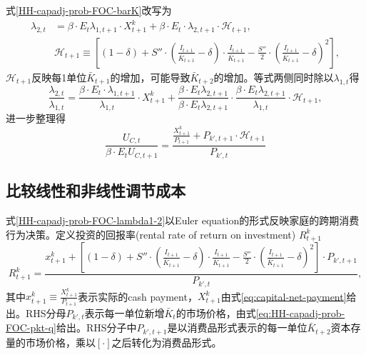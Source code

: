 \begin{subappendices}
式\eqref{HH-capadj-prob-FOC-barK}改写为
\begin{align*}
\lambda_{2,t} &= \beta \cdot E_t \lambda_{1,t+1} \cdot X^k_{t+1} + \beta \cdot E_t \cdot \lambda_{2,t+1 }\cdot \mathcal{H}_{t+1}, \nonumber \\
&\mathcal{H}_{t+1}\equiv \left[
(1-\delta) +S'' \cdot \left(\frac{I_{t+1}}{\bar{K}_{t+1}} - \delta\right) \cdot \frac{I_{t+1}}{\bar{K}_{t+1}}-\frac{S''}{2} \cdot \left(
\frac{I_{t+1}}{\bar{K}_{t+1}} - \delta
\right)^2
\right],
\end{align*}
$\mathcal{H}_{t+1}$反映每1单位$\bar{K}_{t+1}$的增加，可能导致$\bar{K}_{t+2}$的增加。等式两侧同时除以$\lambda_{1,t}$得
\begin{equation*}
\frac{\lambda_{2,t}}{\lambda_{1,t}} = \frac{\beta \cdot E_t \cdot \lambda_{1,t+1}}{\lambda_{1,t}}\cdot X^k_{t+1} +\frac{\beta \cdot E_{t} \lambda_{2,t+1}}{\beta \cdot E_{t} \lambda_{2,t+1}} \cdot \frac{\beta \cdot E_{t} \lambda_{2,t+1}}{\lambda_{1,t}} \cdot \mathcal{H}_{t+1},
\end{equation*}
进一步整理得
\begin{equation}
\label{HH-capadj-prob-FOC-lambda1-2}
\frac{U_{C,t}}{\beta \cdot E_t U_{C,t+1}} = \frac{\frac{X^k_{t+1}}{P_{t+1}} + P_{k',t+1} \cdot %
\mathcal{H}_{t+1}
}{P_{k',t}}
\end{equation}

\subsection{比较线性和非线性调节成本}
\label{sec:adj-cost-comp-lin-nonlin}
式\eqref{HH-capadj-prob-FOC-lambda1-2}以Euler equation的形式反映家庭的跨期消费行为决策。定义投资的回报率(rental rate of return on investment) $R^k_{t+1}$
\begin{equation}
\label{eq:adj-cost-return-investment}
R^k_{t+1} = \frac{x^k_{t+1} + \left[
(1-\delta) + S''\cdot \left(\frac{I_{t+1}}{\bar{K}_{t+1}} - \delta \right) \cdot \frac{I_{t+1}}{\bar{K}_{t+1}} - \frac{S''}{2} \cdot \left(\frac{I_{t+1}}{\bar{K}_{t+1}} - \delta \right)^2
\right] \cdot P_{k',t+1}}{P_{k',t}},
\end{equation}
其中$x^k_{t+1} \equiv \frac{X^k_{t+1}}{P_{t+1}}$表示实际的cash payment，$X^k_{t+1}$由式\eqref{eq:capital-net-payment}给出。RHS分母$P_{k',t}$表示每一单位新增$\bar{K}_t$的市场价格，由式\eqref{eq:HH-capadj-prob-FOC-pkt-q}给出。RHS分子中$P_{k',t+1}$是以消费品形式表示的每一单位$\bar{K}_{t+2}$资本存量的市场价格，乘以$[\cdot]$之后转化为消费品形式。


\end{subappendices}
